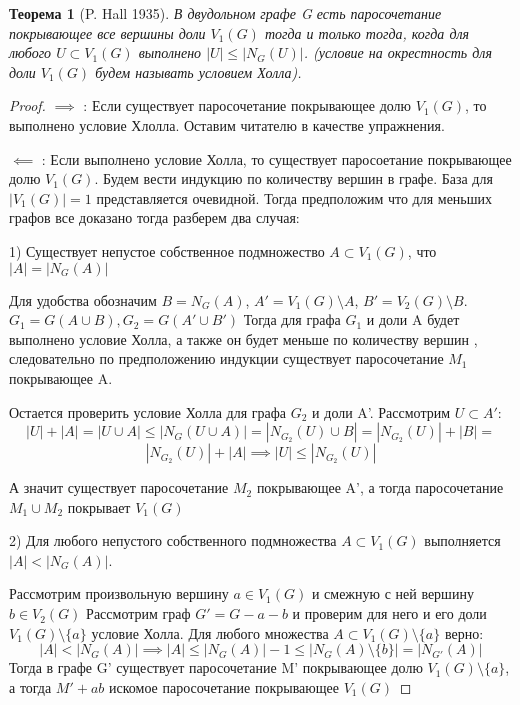 \documentclass{article}
\renewcommand{\le}{\leqslant}
\newtheorem{theorem}{Теорема}
\theoremstyle{definition}
\theoremstyle{remark}
\begin{document}
\begin{theorem} [P. Hall 1935]
В двудольном графе G есть паросочетание покрывающее все вершины доли $V_1(G)$ тогда и только тогда, когда для любого $U \subset V_1(G)$ выполнено $|U| \le |N_G(U)|$. (условие на окрестность для доли $V_1(G)$ будем называть \textit{условием Холла}).
\end{theorem}
\begin{proof}
    $\implies$ : Если существует паросочетание покрывающее долю $V_1(G)$, то выполнено условие Хлолла. 
    Оставим читателю в качестве упражнения.

    $\impliedby$ : Если выполнено условие Холла, то существует паросоетание покрывающее долю $V_1(G)$.
    Будем вести индукцию по количеству вершин в графе. База для $|V_1(G)| = 1$ представляется очевидной. Тогда предположим что для меньших графов все доказано тогда разберем два случая: 


    1) Существует непустое собственное подмножество $A \subset V_1(G)$, что $|A| = |N_G(A)|$

    Для удобства обозначим $B = N_G(A)$, $A' = V_1(G) \setminus A$, $B' = V_2(G) \setminus B$. 
    $G_1 = G(A \cup B) , G_2 = G(A' \cup B')$
    Тогда для графа $G_1$ и доли A будет выполнено условие Холла, а также он будет меньше по количеству вершин , следовательно по предположению индукции существует паросочетание $M_1$ покрывающее A.
    
    Остается проверить условие Холла для графа $G_2$ и доли A'. Рассмотрим $U \subset A'$: 
    $$
    |U| + |A|  = |U \cup A| \le |N_G(U \cup A)| = |N_{G_2}(U) \cup B| = |N_{G_2}(U)| + |B| = 
    $$
    $$
     |N_{G_2}(U)| + |A| \implies |U| \le |N_{G_2}(U)|
    $$

    А значит существует паросочетание $M_2$ покрывающее A', а тогда паросочетание $M_1 \cup M_2$
    покрывает $V_1(G)$ 

    2) Для любого непустого собственного подмножества $A \subset V_1(G)$ выполняется $|A| < |N_G(A)|$.

    Рассмотрим произвольную вершину $a \in V_1(G)$ и смежную с ней вершину $b \in V_2(G)$
    Рассмотрим граф $G' = G - a - b$ и проверим для него и его доли $V_1(G) \setminus \{a\}$ условие Холла. Для любого множества $A \subset V_1(G) \setminus \{a\}$ верно:
    $$
    |A| < |N_G(A)|  \implies |A| \le  |N_G(A)| - 1 \le |N_G(A) \setminus \{b\}| = |N_{G'}(A)| 
    $$
    Тогда в графе G' существует паросочетание M' покрывающее долю $V_1(G) \setminus \{a\}$, а тогда $M' + ab$ искомое паросочетание покрывающее $V_1(G)$
\end{proof}
\end{document}
